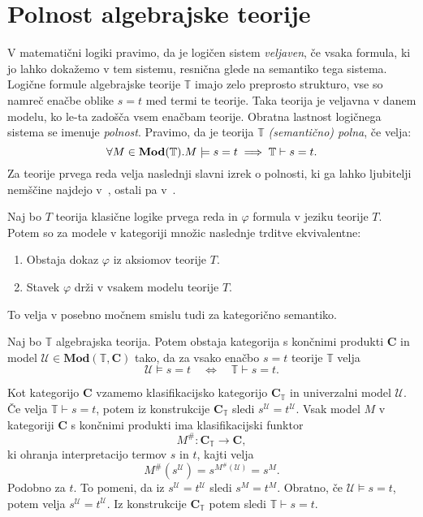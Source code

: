 \documentclass[../kategoricna_logika.tex]{subfiles}
\begin{document}
\section{Polnost algebrajske teorije}
V matematični logiki pravimo, da je logičen sistem \emph{veljaven},
če vsaka formula, ki jo lahko dokažemo v tem sistemu, resnična
glede na semantiko tega sistema. Logične formule algebrajske teorije
$\mathbb{T}$ imajo zelo preprosto strukturo, vse so namreč enačbe
oblike $s = t$ med termi te teorije.
Taka teorija je veljavna v danem modelu, ko le-ta zadošča vsem enačbam teorije.
Obratna lastnost logičnega sistema se imenuje \emph{polnost}.
Pravimo, da je teorija $\mathbb{T}$ \emph{(semantično) polna}, če velja:
$$\forall M \in \mathbf{Mod}(\mathbb{T}).M \models s = t \implies \mathbb{T} \vdash s = t.$$
Za teorije prvega reda velja naslednji slavni izrek o polnosti, ki
ga lahko ljubitelji nemščine najdejo v~\cite{godel-completeness},
ostali pa v~\cite{prijatelj1992osnove2}.
\begin{izrek}[Gödel]
  Naj bo $T$ teorija klasične logike prvega reda in $\varphi$ formula v jeziku teorije $T$.
  Potem so za modele v kategoriji množic naslednje trditve ekvivalentne:
  \begin{enumerate}
  \item Obstaja dokaz $\varphi$ iz aksiomov teorije $T$.
  \item Stavek $\varphi$ drži v vsakem modelu teorije $T$.
  \end{enumerate}
\end{izrek}
To velja v posebno močnem smislu tudi za kategorično semantiko.
\begin{izrek}
  Naj bo $\mathbb{T}$ algebrajska teorija. Potem obstaja kategorija s
  končnimi produkti $\mathbf{C}$ in model
  $\mathcal{U} \in \mathbf{Mod}(\mathbb{T}, \mathbf{C})$ tako, da za vsako
  enačbo $s = t$ teorije $\mathbb{T}$ velja
$$\mathcal{U} \models s = t \quad \Longleftrightarrow \quad \mathbb{T} \vdash s = t.$$
\end{izrek}
\begin{dokaz}
  Kot kategorijo $\mathbf{C}$ vzamemo klasifikacijsko kategorijo
  $\mathbf{C}_\mathbb{T}$ in univerzalni model $\mathcal{U}$. Če
  velja $\mathbb{T} \vdash s = t$, potem iz konstrukcije
  $\mathbf{C}_\mathbb{T}$ sledi $s^\mathcal{U} =
  t^\mathcal{U}$. Vsak model $M$ v kategoriji $\mathbf{C}$
  s končnimi produkti ima klasifikacijski funktor
  \[  M^{\#} : \mathbf{C}_{\mathbb{T}} \to \mathbf{C}, \]
  ki ohranja interpretacijo termov $s$ in $t$, kajti velja
  \[ M^{\#}(s^\mathcal{U}) = s^{M^{\#}(\mathcal{U})} = s^M. \]
  Podobno za $t$.
  To pomeni, da iz $s^{\mathcal{U}} = t^{\mathcal{U}}$ sledi $s^M = t^M$.
  Obratno, če ${\mathcal{U} \models s = t}$, potem velja $s^{\mathcal{U}} = t^{\mathcal{U}}$.
  Iz konstrukcije $\mathbf{C}_{\mathbb{T}}$ potem sledi ${\mathbb{T} \vdash s = t}$.
\end{dokaz}
\end{document}
